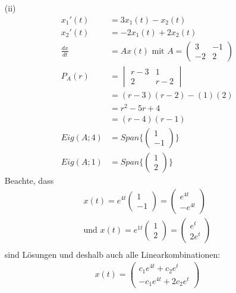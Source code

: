 \begin{itemize}
\item[(ii)]
\begin{align}
x_1'(t) &= 3x_1(t) - x_2(t) \\
x_2'(t) &= -2x_1(t) + 2x_2(t) \\
\frac{dx}{dt} &= Ax(t) \text{ mit } A= \begin{pmatrix} 3 & -1 \\ -2 & 2\end{pmatrix} \\
P_A(r) &= \begin{vmatrix} r-3 & 1 \\ 2 & r-2\end{vmatrix} \\
&=(r-3)(r-2)-(1)(2) \\
&= r^2 - 5r + 4 \\
&= (r-4)(r-1) \\
Eig(A; 4) &= Span\{\begin{pmatrix} 1 \\ -1 \end{pmatrix}\} \\
Eig(A; 1) &= Span\{\begin{pmatrix} 1 \\ 2 \end{pmatrix}\}
\end{align}
Beachte, dass
\begin{align}
x(t) = e^{4t} \begin{pmatrix} 1 \\ -1 \end{pmatrix} = \begin{pmatrix} e^{4t} \\ -e^{4t} \end{pmatrix} \\
\text{und } x(t) = e^{1t} \begin{pmatrix} 1 \\ 2 \end{pmatrix} = \begin{pmatrix} e^{t} \\ 2e^{t} \end{pmatrix} \\
\end{align}
sind Lösungen und deshalb auch alle Linearkombinationen:
\begin{align}
x(t) = \begin{pmatrix} c_1 e^{4t} + c_2 e^t \\ -c_1 e^{4t} + 2c_2 e^t\end{pmatrix}
\end{align}
\end{itemize}

